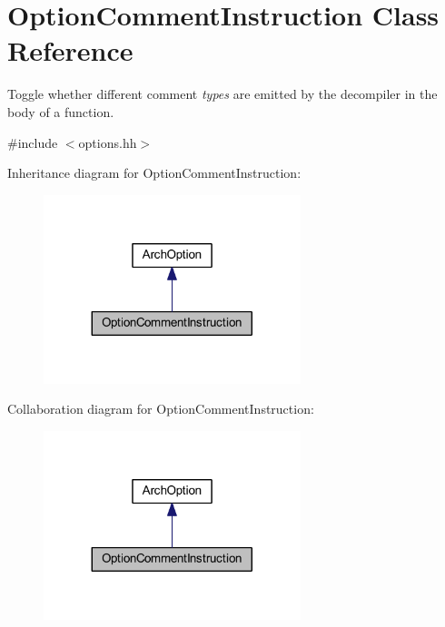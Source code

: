 \hypertarget{class_option_comment_instruction}{}\section{Option\+Comment\+Instruction Class Reference}
\label{class_option_comment_instruction}


Toggle whether different comment {\itshape types} are emitted by the decompiler in the body of a function.  




{\ttfamily \#include $<$options.\+hh$>$}



Inheritance diagram for Option\+Comment\+Instruction\+:
\nopagebreak
\begin{figure}[H]
\begin{center}
\leavevmode
\includegraphics[width=212pt]{class_option_comment_instruction__inherit__graph}
\end{center}
\end{figure}


Collaboration diagram for Option\+Comment\+Instruction\+:
\nopagebreak
\begin{figure}[H]
\begin{center}
\leavevmode
\includegraphics[width=212pt]{class_option_comment_instruction__coll__graph}
\end{center}
\end{figure}
